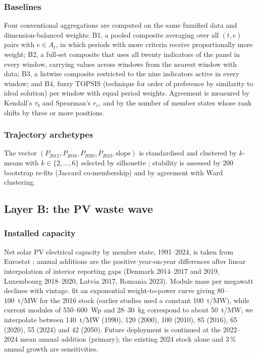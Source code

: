 \documentclass[a4paper,fleqn]{cas-sc}
\begin{document}
\subsubsection{Baselines} Four conventional aggregations are computed on the same fuzzified data and dimension-balanced weights: B1, a pooled composite averaging over all $(t,e)$ pairs with $e\in A_t$, in which periods with more criteria receive proportionally more weight; B2, a full-set composite that uses all twenty indicators of the panel in every window, carrying values across windows from the nearest window with data; B3, a listwise composite restricted to the nine indicators active in every window; and B4, fuzzy TOPSIS (technique for order of preference by similarity to ideal solution) \citep{hwang1981,chen2000topsis} per window with equal period weights. Agreement is measured by Kendall's $\tau_b$ \citep{kendall1938} and Spearman's $r_s$, and by the number of member states whose rank shifts by three or more positions.

\subsubsection{Trajectory archetypes} The vector $(P_{2012},P_{2016},P_{2020},P_{2023},\text{slope})$ is standardised and clustered by $k$-means with $k\in\{2,\dots,6\}$ selected by silhouette \citep{rousseeuw1987}; stability is assessed by 200 bootstrap re-fits (Jaccard co-membership) \citep{hennig2007} and by agreement with Ward clustering.

\subsection{Layer B: the PV waste wave}\label{sec:layerB}
\subsubsection{Installed capacity} Net solar PV electrical capacity by member state, 1991--2024, is taken from Eurostat \citep{eurostat_nrg}; annual additions are the positive year-on-year differences after linear interpolation of interior reporting gaps (Denmark 2014--2017 and 2019, Luxembourg 2018--2020, Latvia 2017, Romania 2023). Module mass per megawatt declines with vintage. \citet{irena2016} fit an exponential weight-to-power curve giving 80--\SI{100}{t/MW} for the 2016 stock (earlier studies used a constant \SI{100}{t/MW}), while current modules of 550--\SI{600}{Wp} and 28--\SI{30}{kg} correspond to about \SI{50}{t/MW}; we interpolate between \SI{140}{t/MW} (1990), 120 (2000), 100 (2010), 85 (2016), 65 (2020), 55 (2024) and 42 (2050). Future deployment is continued at the 2022--2024 mean annual addition (primary); the existing 2024 stock alone and 3\,\% annual growth are sensitivities.
\end{document}
